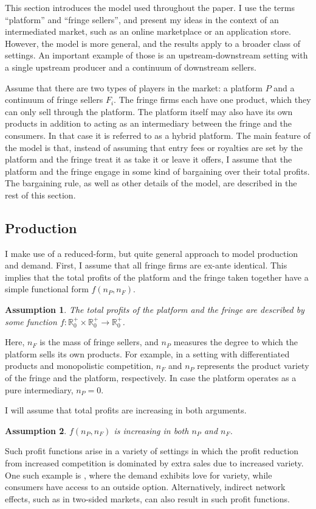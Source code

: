 \documentclass[a4paper]{article}
\newtheorem{assumption}{Assumption}
\begin{document}
This section introduces the model used throughout the paper.
I use the terms ``platform'' and ``fringe sellers'', and present my ideas in the context of an intermediated market, such as an online marketplace or an application store.
However, the model is more general, and the results apply to a broader class of settings.
An important example of those is an upstream-downstream setting with a single upstream producer and a continuum of downstream sellers.

Assume that there are two types of players in the market: a platform $P$ and a continuum of fringe sellers $F_i$.
The fringe firms each have one product, which they can only sell through the platform.
The platform itself may also have its own products in addition to acting as an intermediary between the fringe and the consumers.
In that case it is referred to as a hybrid platform.
The main feature of the model is that, instead of assuming that entry fees or royalties are set by the platform and the fringe treat it as take it or leave it offers, I assume that the platform and the fringe engage in some kind of bargaining over their total profits.
The bargaining rule, as well as other details of the model, are described in the rest of this section.


\subsection{Production}

I make use of a reduced-form, but quite general approach to model production and demand.
First, I assume that all fringe firms are ex-ante identical.
This implies that the total profits of the platform and the fringe taken together have a simple functional form $f(n_P, n_F)$.
\begin{assumption}
    \label{ass:identical_fringe}
    The total profits of the platform and the fringe are described by some function $f: \mathbb{R}^+_0 \times \mathbb{R}^+_0 \to \mathbb{R}^+_0$.
\end{assumption}
Here, $n_F$ is the mass of fringe sellers, and $n_P$ measures the degree to which the platform sells its own products.
For example, in a setting with differentiated products and monopolistic competition, $n_F$ and $n_P$ represents the product variety of the fringe and the platform, respectively.
In case the platform operates as a pure intermediary, $n_P = 0$.

I will assume that total profits are increasing in both arguments.
\begin{assumption}
    \label{ass:monotone_profits}
    $f(n_P, n_F)$ is increasing in both $n_P$ and $n_F$.
\end{assumption}
Such profit functions arise in a variety of settings in which the profit reduction from increased competition is dominated by extra sales due to increased variety.
One such example is \textcite{anderson2020aggregative}, where the demand exhibits love for variety, while consumers have access to an outside option.
Alternatively, indirect network effects, such as in two-sided markets, can also result in such profit functions.
\end{document}

